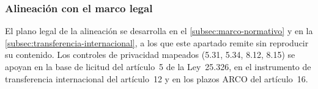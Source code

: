 \subsubsection{Alineación con el marco legal}\label{subsec:cumplimiento-legal}

El plano legal de la alineación se desarrolla en el \autoref{subsec:marco-normativo} y en la \autoref{subsec:transferencia-internacional}, a los que este apartado remite sin reproducir su contenido. Los controles de privacidad mapeados (5.31, 5.34, 8.12, 8.15) se apoyan en la base de licitud del artículo~5 de la Ley~25.326, en el instrumento de transferencia internacional del artículo~12 y en los plazos ARCO del artículo~16.

\newpage
